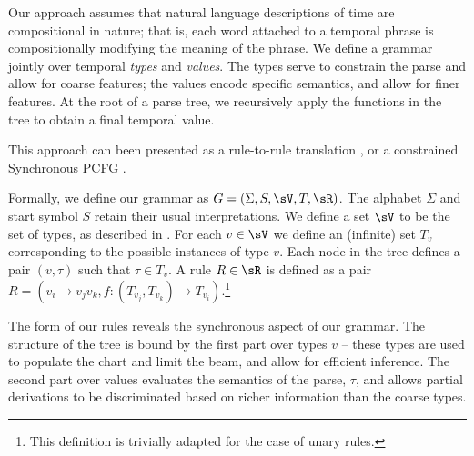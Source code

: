 Our approach assumes that natural language descriptions
	of time are compositional in nature; that is,
  each word attached to a temporal phrase is 
	compositionally modifying the meaning of the phrase.
We define a grammar jointly over temporal \textit{types} and
  \textit{values}.
The types serve to constrain the parse and allow for coarse features;
  the values encode specific semantics, and allow for finer
  features.
At the root of a parse tree, we recursively apply the functions in the tree
	to obtain a final temporal value.

This approach can been presented as a rule-to-rule translation
	\cite[p.~263]{key:1976bach-semantics,key:1995allen-semantics},
	or a constrained Synchronous PCFG
	\cite{key:2001yamada-syntaxmt}.


Formally, we define our  grammar as
	\mbox{$G=\left(\Sigma,S,\sV,T,\sR\right)$}.
The alphabet $\Sigma$ and start symbol $S$ retain their usual interpretations.
We define a set $\sV$ to be the set of types, as described in
	.
For each $v \in \sV$ we define an (infinite) set $T_v$ corresponding to the 
	possible instances of type $v$.
Each node in the tree defines a pair $(v, \tau)$ such that $\tau \in T_v$.
A rule \mbox{$R \in \sR$} is defined as a pair 
	\mbox{$R = \left(v_i \rightarrow v_jv_k, 
		f : (T_{v_j},T_{v_k}) \rightarrow T_{v_i}\right)$}.\footnote{
      This definition is trivially adapted for the case of unary
      rules.
    }

The form of our rules reveals the synchronous aspect of our grammar.
The structure of the tree is bound by the first part over types $v$ --
  these types are used to populate the chart and limit the beam, and allow
  for efficient inference.
The second part over values evaluates the semantics of the parse, $\tau$,
  and allows
  partial derivations to be discriminated based on richer information than the
  coarse types.

